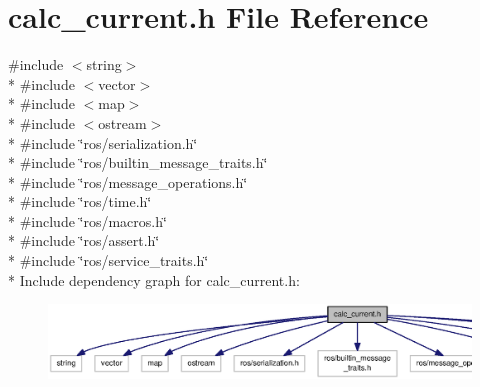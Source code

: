 \section{calc\-\_\-current.\-h File Reference}
\label{calc__current_8h}
{\ttfamily \#include $<$string$>$}\\*
{\ttfamily \#include $<$vector$>$}\\*
{\ttfamily \#include $<$map$>$}\\*
{\ttfamily \#include $<$ostream$>$}\\*
{\ttfamily \#include \char`\"{}ros/serialization.\-h\char`\"{}}\\*
{\ttfamily \#include \char`\"{}ros/builtin\-\_\-message\-\_\-traits.\-h\char`\"{}}\\*
{\ttfamily \#include \char`\"{}ros/message\-\_\-operations.\-h\char`\"{}}\\*
{\ttfamily \#include \char`\"{}ros/time.\-h\char`\"{}}\\*
{\ttfamily \#include \char`\"{}ros/macros.\-h\char`\"{}}\\*
{\ttfamily \#include \char`\"{}ros/assert.\-h\char`\"{}}\\*
{\ttfamily \#include \char`\"{}ros/service\-\_\-traits.\-h\char`\"{}}\\*
Include dependency graph for calc\-\_\-current.\-h\-:\nopagebreak
\begin{figure}[H]
\begin{center}
\leavevmode
\includegraphics[width=350pt]{calc__current_8h__incl}
\end{center}
\end{figure}
